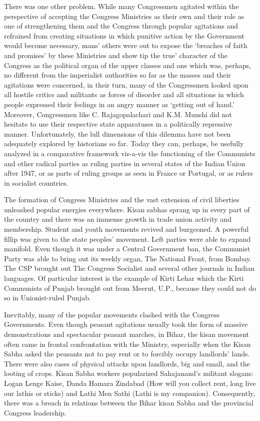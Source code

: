 There was one other problem. While many Congressmen agitated within the perspective of accepting the Congress Ministries as their own and their role as one of strengthening them and the Congress through popular agitations and refrained from creating situations in which punitive action by the Government would become necessary, mans' others were out to expose the `breaches of faith and promises' by these Ministries and show tip the true' character of the Congress as the political organ of the upper classes and one which was, perhaps, no different from the imperialist authorities so far as the masses and their agitations were concerned, in their turn, many of the Congressmen looked upon all hostile critics and militants as forces of disorder and all situations in which people expressed their feelings in an angry manner as `getting out of hand.' Moreover, Congressmen like C. Rajagopalachari and K.M. Munshi did not hesitate to use their respective state apparatuses in a politically repressive manner. Unfortunately, the lull dimensions of this dilemma have not been adequately explored by historians so far. Today they can, perhaps, be usefully analyzed in a comparative framework vis-a-vis the functioning of the Communists and other radical parties as ruling parties in several states of the Indian Union after 1947, or as parts of ruling groups as seen in France or Portugal, or as rulers in socialist countries. 

The formation of Congress Ministries and the vast extension of civil liberties unleashed popular energies everywhere. Kisan sabhas sprang up in every part of the country and there was an immense growth in trade union activity and membership. Student and youth movements revived and burgeoned. A powerful fillip was given to the state peoples' movement. Left parties were able to expand manifold. Even though it was under a Central Government ban, the Communist Party was able to bring out its weekly organ, The National Front, from Bombay. The CSP brought out The Congress Socialist and several other journals in Indian languages. Of particular interest is the example of Kirti Lehar which the Kirti Communists of Punjab brought out from Meerut, U.P., because they could not do so in Unionist-ruled Punjab. 

Inevitably, many of the popular movements clashed with the Congress Governments. Even though peasant agitations usually took the form of massive demonstrations and spectacular peasant marches, in Bihar, the kisan movement often came in frontal confrontation with the Ministry, especially when the Kisan Sabha asked the peasants not to pay rent or to forcibly occupy landlords' lands. There were also cases of physical attacks upon landlords, big and small, and the looting of crops. Kisan Sabha workers popularized Sahajanand's militant slogans: Logan Lenge Kaise, Danda Hamara Zindabad (How will you collect rent, long live our lathis or sticks) and Lathi Men Sathi (Lathi is my companion). Consequently, there was a breach in relations between the Bihar kisan Sabha and the provincial Congress leadership. 

